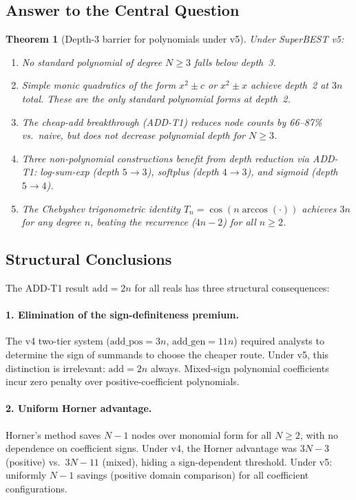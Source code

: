 \documentclass[11pt,a4paper]{article}
\newtheorem{theorem}{Theorem}[section]
\begin{document}
\subsection{Answer to the Central Question}

\begin{theorem}[Depth-3 barrier for polynomials under v5]
\label{thm:main}
  Under SuperBEST v5:
  \begin{enumerate}
    \item No standard polynomial of degree $N \geq 3$ falls below depth~3.
    \item Simple monic quadratics of the form $x^2 \pm c$ or $x^2 \pm x$ achieve depth~2
          at $3n$ total. These are the \emph{only} standard polynomial forms at depth~2.
    \item The cheap-add breakthrough (ADD-T1) reduces node counts by 66--87\% vs.\ naive,
          but does not decrease polynomial depth for $N \geq 3$.
    \item Three non-polynomial constructions benefit from depth reduction via ADD-T1:
          log-sum-exp (depth $5 \to 3$), softplus (depth $4 \to 3$), and
          sigmoid (depth $5 \to 4$).
    \item The Chebyshev trigonometric identity $T_n = \cos(n\arccos(\cdot))$ achieves
          $3n$ for any degree $n$, beating the recurrence ($4n-2$) for all $n \geq 2$.
  \end{enumerate}
\end{theorem}

\subsection{Structural Conclusions}

The ADD-T1 result $\text{add} = 2n$ for all reals has three structural consequences:

\paragraph{1. Elimination of the sign-definiteness premium.}
The v4 two-tier system ($\text{add\_pos} = 3n$, $\text{add\_gen} = 11n$) required
analysts to determine the sign of summands to choose the cheaper route. Under v5, this
distinction is irrelevant: $\text{add} = 2n$ always. Mixed-sign polynomial coefficients
incur zero penalty over positive-coefficient polynomials.

\paragraph{2. Uniform Horner advantage.}
Horner's method saves $N-1$ nodes over monomial form for all $N \geq 2$, with no
dependence on coefficient signs. Under v4, the Horner advantage was $3N-3$ (positive)
vs.\ $3N-11$ (mixed), hiding a sign-dependent threshold. Under v5: uniformly $N-1$ savings
(positive domain comparison) for all coefficient configurations.
\end{document}
